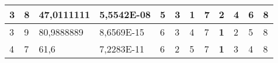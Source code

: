 \documentclass[conference]{IEEEtran}
\begin{document}
\begin{table*}[]
\begin{tabular}{|llll|llllllll|}
\multicolumn{1}{|l|}{3}                                                     & \multicolumn{1}{l|}{8}                                                        & \multicolumn{1}{l|}{47,0111111}                                                   & 5,5542E-08                     & \multicolumn{1}{l|}{5}                                                  & \multicolumn{1}{l|}{3}                                                  & \multicolumn{1}{l|}{\textbf{1}}                                         & \multicolumn{1}{l|}{7}                                                  & \multicolumn{1}{l|}{2}                                                  & \multicolumn{1}{l|}{4}                                                  & \multicolumn{1}{l|}{6}                                                  & 8                          \\ \hline
\multicolumn{1}{|l|}{3}                                                     & \multicolumn{1}{l|}{9}                                                        & \multicolumn{1}{l|}{80,9888889}                                                   & 8,6569E-15                     & \multicolumn{1}{l|}{6}                                                  & \multicolumn{1}{l|}{3}                                                  & \multicolumn{1}{l|}{4}                                                  & \multicolumn{1}{l|}{7}                                                  & \multicolumn{1}{l|}{\textbf{1}}                                         & \multicolumn{1}{l|}{2}                                                  & \multicolumn{1}{l|}{5}                                                  & 8                          \\ \hline
\multicolumn{1}{|l|}{4}                                                     & \multicolumn{1}{l|}{7}                                                        & \multicolumn{1}{l|}{61,6}                                                         & 7,2283E-11                     & \multicolumn{1}{l|}{6}                                                  & \multicolumn{1}{l|}{2}                                                  & \multicolumn{1}{l|}{5}                                                  & \multicolumn{1}{l|}{7}                                                  & \multicolumn{1}{l|}{\textbf{1}}                                         & \multicolumn{1}{l|}{3}                                                  & \multicolumn{1}{l|}{4}                                                  & 8                          \\ \hline

\end{tabular}
\end{table*}
\end{document}

